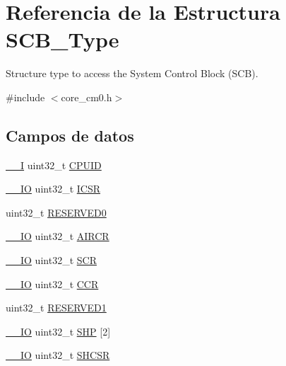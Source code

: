 \hypertarget{struct_s_c_b___type}{}\section{Referencia de la Estructura S\+C\+B\+\_\+\+Type}
\label{struct_s_c_b___type}


Structure type to access the System Control Block (S\+CB).  




{\ttfamily \#include $<$core\+\_\+cm0.\+h$>$}

\subsection*{Campos de datos}
\begin{DoxyCompactItemize}
\item 
\hyperlink{core__sc300_8h_af63697ed9952cc71e1225efe205f6cd3}{\+\_\+\+\_\+I} uint32\+\_\+t \hyperlink{struct_s_c_b___type_a30abfea43143a424074f682bd61eace0}{C\+P\+U\+ID}
\item 
\hyperlink{core__sc300_8h_aec43007d9998a0a0e01faede4133d6be}{\+\_\+\+\_\+\+IO} uint32\+\_\+t \hyperlink{struct_s_c_b___type_a8fec9e122b923822e7f951cd48cf1d47}{I\+C\+SR}
\item 
uint32\+\_\+t \hyperlink{struct_s_c_b___type_af86c61a5d38a4fc9cef942a12744486b}{R\+E\+S\+E\+R\+V\+E\+D0}
\item 
\hyperlink{core__sc300_8h_aec43007d9998a0a0e01faede4133d6be}{\+\_\+\+\_\+\+IO} uint32\+\_\+t \hyperlink{struct_s_c_b___type_aaec159b48828355cb770049b8b2e8d91}{A\+I\+R\+CR}
\item 
\hyperlink{core__sc300_8h_aec43007d9998a0a0e01faede4133d6be}{\+\_\+\+\_\+\+IO} uint32\+\_\+t \hyperlink{struct_s_c_b___type_a64a95891ad3e904dd5548112539c1c98}{S\+CR}
\item 
\hyperlink{core__sc300_8h_aec43007d9998a0a0e01faede4133d6be}{\+\_\+\+\_\+\+IO} uint32\+\_\+t \hyperlink{struct_s_c_b___type_a5e1322e27c40bf91d172f9673f205c97}{C\+CR}
\item 
uint32\+\_\+t \hyperlink{struct_s_c_b___type_ac4ac04e673b5b8320d53f7b0947db902}{R\+E\+S\+E\+R\+V\+E\+D1}
\item 
\hyperlink{core__sc300_8h_aec43007d9998a0a0e01faede4133d6be}{\+\_\+\+\_\+\+IO} uint32\+\_\+t \hyperlink{struct_s_c_b___type_af6c413ed8c7d1b792a91f01e13b47adf}{S\+HP} \mbox{[}2\mbox{]}
\item 
\hyperlink{core__sc300_8h_aec43007d9998a0a0e01faede4133d6be}{\+\_\+\+\_\+\+IO} uint32\+\_\+t \hyperlink{struct_s_c_b___type_a04d136e5436e5fa2fb2aaa78a5f86b19}{S\+H\+C\+SR}

\end{DoxyCompactItemize}
